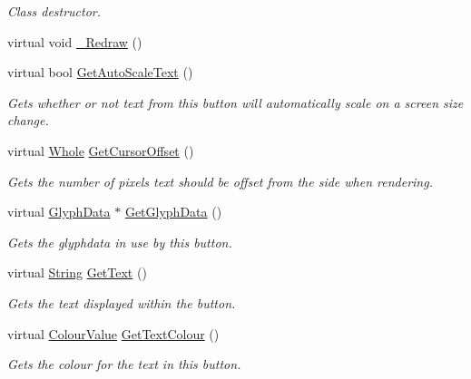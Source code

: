 \begin{DoxyCompactItemize}
\begin{DoxyCompactList}\small\item\em Class destructor. \item\end{DoxyCompactList}\item 
virtual void \hyperlink{classMezzanine_1_1UI_1_1TextButton_a1db8e160fd6f9327b298b69776ed7da7}{\_\-Redraw} ()
\item 
virtual bool \hyperlink{classMezzanine_1_1UI_1_1TextButton_a56d50b33b0fe2bf25c420dc70bf10d1c}{GetAutoScaleText} ()
\begin{DoxyCompactList}\small\item\em Gets whether or not text from this button will automatically scale on a screen size change. \item\end{DoxyCompactList}\item 
virtual \hyperlink{namespaceMezzanine_adcbb6ce6d1eb4379d109e51171e2e493}{Whole} \hyperlink{classMezzanine_1_1UI_1_1TextButton_a8354a7da8466fa8fdea0180b8049a0f7}{GetCursorOffset} ()
\begin{DoxyCompactList}\small\item\em Gets the number of pixels text should be offset from the side when rendering. \item\end{DoxyCompactList}\item 
virtual \hyperlink{classMezzanine_1_1UI_1_1GlyphData}{GlyphData} $\ast$ \hyperlink{classMezzanine_1_1UI_1_1TextButton_af628a466d50d5f99138ff827bf1e97bb}{GetGlyphData} ()
\begin{DoxyCompactList}\small\item\em Gets the glyphdata in use by this button. \item\end{DoxyCompactList}\item 
virtual \hyperlink{namespaceMezzanine_acf9fcc130e6ebf08e3d8491aebcf1c86}{String} \hyperlink{classMezzanine_1_1UI_1_1TextButton_abe0c6b3e64217fa05f38437f692d5e64}{GetText} ()
\begin{DoxyCompactList}\small\item\em Gets the text displayed within the button. \item\end{DoxyCompactList}\item 
virtual \hyperlink{classMezzanine_1_1ColourValue}{ColourValue} \hyperlink{classMezzanine_1_1UI_1_1TextButton_abf8c954f300892ec5d5b8adcaa1e7078}{GetTextColour} ()
\begin{DoxyCompactList}\small\item\em Gets the colour for the text in this button. \item\end{DoxyCompactList}\item 

\end{DoxyCompactItemize}
